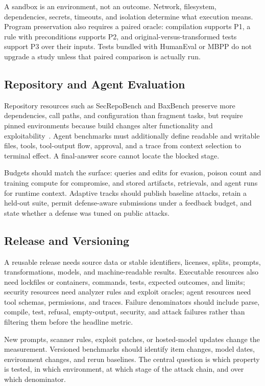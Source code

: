 \documentclass[acmsmall,screen,review]{acmart}
\begin{document}
A sandbox is an environment, not an outcome. Network, filesystem, dependencies, secrets, timeouts, and isolation determine what execution means. Program preservation also requires a paired oracle: compilation supports P1, a rule with preconditions supports P2, and original-versus-transformed tests support P3 over their inputs. Tests bundled with HumanEval or MBPP do not upgrade a study unless that paired comparison is actually run.

\subsection{Repository and Agent Evaluation}
Repository resources such as SecRepoBench and BaxBench preserve more dependencies, call paths, and configuration than fragment tasks, but require pinned environments because build changes alter functionality and exploitability~\cite{secrepobench2025,baxbench2025}. Agent benchmarks must additionally define readable and writable files, tools, tool-output flow, approval, and a trace from context selection to terminal effect. A final-answer score cannot locate the blocked stage.

Budgets should match the surface: queries and edits for evasion, poison count and training compute for compromise, and stored artifacts, retrievals, and agent runs for runtime context. Adaptive tracks should publish baseline attacks, retain a held-out suite, permit defense-aware submissions under a feedback budget, and state whether a defense was tuned on public attacks.

\subsection{Release and Versioning}
A reusable release needs source data or stable identifiers, licenses, splits, prompts, transformations, models, and machine-readable results. Executable resources also need lockfiles or containers, commands, tests, expected outcomes, and limits; security resources need analyzer rules and exploit oracles; agent resources need tool schemas, permissions, and traces. Failure denominators should include parse, compile, test, refusal, empty-output, security, and attack failures rather than filtering them before the headline metric.

New prompts, scanner rules, exploit patches, or hosted-model updates change the measurement. Versioned benchmarks should identify item changes, model dates, environment changes, and rerun baselines. The central question is which property is tested, in which environment, at which stage of the attack chain, and over which denominator.
\end{document}
